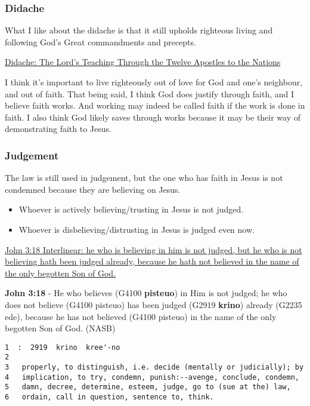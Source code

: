 \documentclass[11pt]{article}
\begin{document}
\subsubsection{Didache}
\label{sec:org039635d}
What I like about the didache is that it still upholds righteous living and following God's Great commandments and precepts.

\href{https://www.earlychristianwritings.com/text/didache-roberts.html}{Didache: The Lord's Teaching Through the Twelve Apostles to the Nations}

I think it's important to live righteously out of love for God and one's neighbour, and out of faith.
That being said, I think God does justify through faith, and I believe faith works. And working may indeed be called faith if the work is done in faith.
I also think God likely saves through works because it may be their way of demonstrating faith to Jesus.

\subsubsection{Judgement}
\label{sec:org47c542e}
The law is still used in judgement, but the one who has faith in Jesus is not condemned because they are believing on Jesus.

\begin{itemize}
\item Whoever is actively believing/trusting in Jesus is not judged.
\item Whoever is disbelieving/distrusting in Jesus is judged even now.
\end{itemize}

\href{https://biblehub.com/interlinear/john/3-18.htm}{John 3:18 Interlinear: he who is believing in him is not judged, but he who is not believing hath been judged already, because he hath not believed in the name of the only begotten Son of God.}

\textbf{John 3:18} - He who believes (G4100 \textbf{pisteuo}) in Him is not judged; he who does not believe (G4100 pisteuo) has been judged (G2919 \textbf{krino}) already (G2235 ede), because he has not believed (G4100 pisteuo) in the name of the only begotten Son of God. (NASB)

\begin{verbatim}
1  :  2919  krino  kree'-no
2  
3   properly, to distinguish, i.e. decide (mentally or judicially); by
4   implication, to try, condemn, punish:--avenge, conclude, condemn,
5   damn, decree, determine, esteem, judge, go to (sue at the) law,
6   ordain, call in question, sentence to, think.
\end{verbatim}
\end{document}
